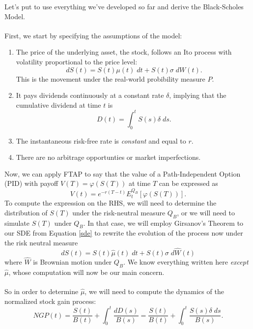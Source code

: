 \documentclass[12pt]{article}
\theoremstyle{plain}
\theoremstyle{definition}
\theoremstyle{remark}
\begin{document}
Let's put to use everything we've developed so far and derive the 
Black-Scholes Model.
\\
\\
First, we start by specifying the assumptions of the model:
\begin{enumerate}
   \item{The price of the underlying asset, the stock, follows
      an Ito process with volatility proportional to the price
      level:
      \begin{equation}
	 \label{sde}
	 dS(t) = S(t)\mu(t) \; dt + S(t) \sigma \; dW(t).
      \end{equation}
      This is the movement under the real-world probibility measure $P$.
      }
   \item{It pays dividends continuously at a constant rate $\delta$,
      implying that the cumulative dividend at time $t$ is
	 \[ D(t) = \int^t_0 S(s) \delta \; ds .\]
      }
   \item{The instantaneous risk-free rate is \emph{constant} and 
      equal to $r$.}
   \item{There are no arbitrage opportunties or market imperfections.}
\end{enumerate}
Now, we can apply FTAP to say that the value of a Path-Independent
Option (PID) with payoff $V(T) = \varphi(S(T))$ at time $T$ can be 
expressed as
   \[ V(t) = e^{-r(T-t)}E_t^{Q_B}\left[\varphi(S(T))\right].\]
To compute the expression on the RHS, we will need to determine
the distribution of $S(T)$ under the risk-neutral measure $Q_B$, or
we will need to simulate $S(T)$ under $Q_B$.  In that case, 
we will employ Girsanov's Theorem to our SDE from Equation \ref{sde}
to rewrite the evolution of the process now under the risk neutral
measure
\begin{equation}
   \label{girs}
   dS(t) = S(t)\hat{\mu}(t) \; dt + S(t) \sigma \; d\hat{W}(t) 
\end{equation}
where $\hat{W}$ is Brownian motion under $Q_B$. We know everything
written here \emph{except} $\hat{\mu}$, whose computation will
now be our main concern.
\\
\\
So in order to determine $\hat{\mu}$, we will need to compute
the dynamics of the normalized stock gain process:
\begin{equation}
   \label{ngp}
   NGP(t) = \frac{S(t)}{B(t)} + \int^t_0 \frac{dD(s)}{B(s)} =
   \frac{S(t)}{B(t)} + \int^t_0 \frac{S(s)\delta \; ds }{B(s)}.
\end{equation}
\end{document}
